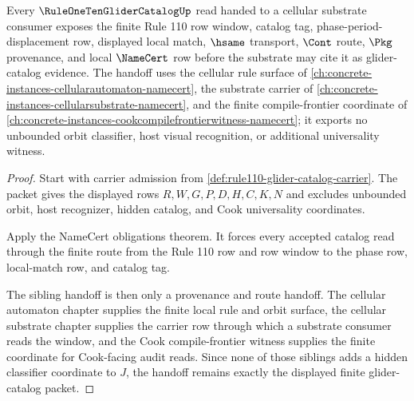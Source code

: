 \begin{theorem}
\label{thm:rule110-glider-catalog-substrate-handoff}
Every $\RuleOneTenGliderCatalogUp$ read handed to a cellular substrate consumer exposes the finite Rule 110 row window, catalog tag, phase-period-displacement row, displayed local match, $\hsame$ transport, $\Cont$ route, $\Pkg$ provenance, and local $\NameCert$ row before the substrate may cite it as glider-catalog evidence. The handoff uses the cellular rule surface of \autoref{ch:concrete-instances-cellularautomaton-namecert}, the substrate carrier of \autoref{ch:concrete-instances-cellularsubstrate-namecert}, and the finite compile-frontier coordinate of \autoref{ch:concrete-instances-cookcompilefrontierwitness-namecert}; it exports no unbounded orbit classifier, host visual recognition, or additional universality witness.
\end{theorem}
\begin{proof}
Start with carrier admission from \autoref{def:rule110-glider-catalog-carrier}. The packet gives the displayed rows $R,W,G,P,D,H,C,K,N$ and excludes unbounded orbit, host recognizer, hidden catalog, and Cook universality coordinates.

Apply the NameCert obligations theorem. It forces every accepted catalog read through the finite route from the Rule 110 row and row window to the phase row, local-match row, and catalog tag.

The sibling handoff is then only a provenance and route handoff. The cellular automaton chapter supplies the finite local rule and orbit surface, the cellular substrate chapter supplies the carrier row through which a substrate consumer reads the window, and the Cook compile-frontier witness supplies the finite coordinate for Cook-facing audit reads. Since none of those siblings adds a hidden classifier coordinate to $J$, the handoff remains exactly the displayed finite glider-catalog packet.
\end{proof}


